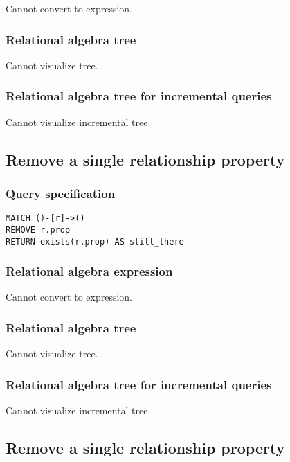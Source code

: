 Cannot convert to expression.

\subsubsection*{Relational algebra tree}

Cannot visualize tree.

\subsubsection*{Relational algebra tree for incremental queries}

Cannot visualize incremental tree.

\subsection{Remove a single relationship property}

\subsubsection*{Query specification}

\begin{lstlisting}
MATCH ()-[r]->()
REMOVE r.prop
RETURN exists(r.prop) AS still_there
\end{lstlisting}

\subsubsection*{Relational algebra expression}

Cannot convert to expression.

\subsubsection*{Relational algebra tree}

Cannot visualize tree.

\subsubsection*{Relational algebra tree for incremental queries}

Cannot visualize incremental tree.

\subsection{Remove a single relationship property}

